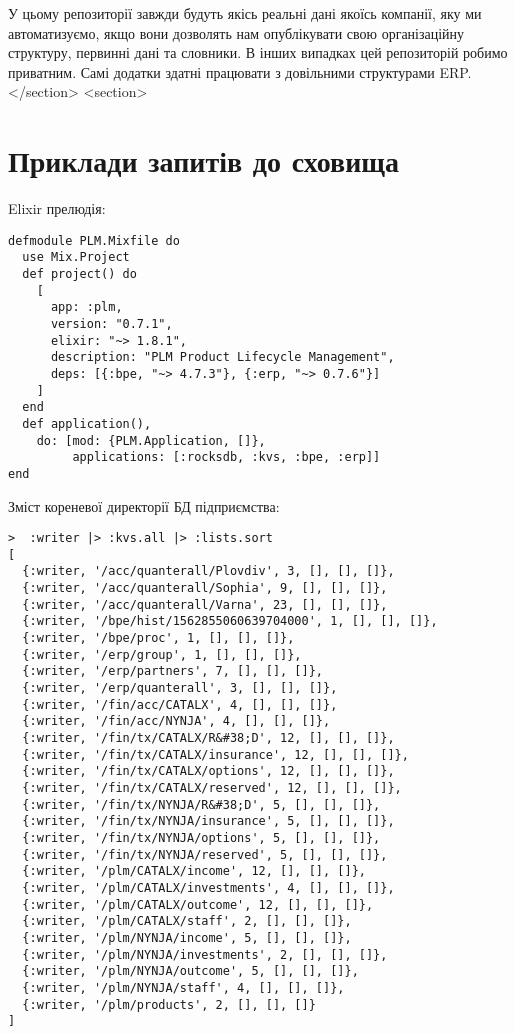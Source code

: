         У цьому репозиторії завжди будуть якісь реальні дані якоїсь компанії,
           яку ми автоматизуємо, якщо вони дозволять нам опублікувати свою
           організаційну структуру, первинні дані та словники. В інших випадках цей репозиторій
           робимо приватним. Самі додатки здатні працювати з довільними структурами ERP.
    </section>
    <section>
        \section{Приклади запитів до сховища}

        Elixir прелюдія:

   \begin{lstlisting}
defmodule PLM.Mixfile do
  use Mix.Project
  def project() do
    [
      app: :plm,
      version: "0.7.1",
      elixir: "~> 1.8.1",
      description: "PLM Product Lifecycle Management",
      deps: [{:bpe, "~> 4.7.3"}, {:erp, "~> 0.7.6"}]
    ]
  end
  def application(),
    do: [mod: {PLM.Application, []},
         applications: [:rocksdb, :kvs, :bpe, :erp]]
end
    \end{lstlisting}

        Зміст кореневої директорії БД підприємства:

   \begin{lstlisting}
>  :writer |> :kvs.all |> :lists.sort
[
  {:writer, '/acc/quanterall/Plovdiv', 3, [], [], []},
  {:writer, '/acc/quanterall/Sophia', 9, [], [], []},
  {:writer, '/acc/quanterall/Varna', 23, [], [], []},
  {:writer, '/bpe/hist/1562855060639704000', 1, [], [], []},
  {:writer, '/bpe/proc', 1, [], [], []},
  {:writer, '/erp/group', 1, [], [], []},
  {:writer, '/erp/partners', 7, [], [], []},
  {:writer, '/erp/quanterall', 3, [], [], []},
  {:writer, '/fin/acc/CATALX', 4, [], [], []},
  {:writer, '/fin/acc/NYNJA', 4, [], [], []},
  {:writer, '/fin/tx/CATALX/R&#38;D', 12, [], [], []},
  {:writer, '/fin/tx/CATALX/insurance', 12, [], [], []},
  {:writer, '/fin/tx/CATALX/options', 12, [], [], []},
  {:writer, '/fin/tx/CATALX/reserved', 12, [], [], []},
  {:writer, '/fin/tx/NYNJA/R&#38;D', 5, [], [], []},
  {:writer, '/fin/tx/NYNJA/insurance', 5, [], [], []},
  {:writer, '/fin/tx/NYNJA/options', 5, [], [], []},
  {:writer, '/fin/tx/NYNJA/reserved', 5, [], [], []},
  {:writer, '/plm/CATALX/income', 12, [], [], []},
  {:writer, '/plm/CATALX/investments', 4, [], [], []},
  {:writer, '/plm/CATALX/outcome', 12, [], [], []},
  {:writer, '/plm/CATALX/staff', 2, [], [], []},
  {:writer, '/plm/NYNJA/income', 5, [], [], []},
  {:writer, '/plm/NYNJA/investments', 2, [], [], []},
  {:writer, '/plm/NYNJA/outcome', 5, [], [], []},
  {:writer, '/plm/NYNJA/staff', 4, [], [], []},
  {:writer, '/plm/products', 2, [], [], []}
]
    \end{lstlisting}

